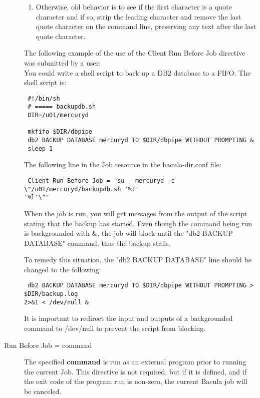 \begin{description}
\begin{enumerate}
\item  Otherwise, old behavior is to see if the first character is
         a quote character and if so, strip the leading character and
         remove the last quote character on the command line, preserving
         any text after the last quote character. 
   
\end{enumerate}

   
The following example of the use of the Client Run Before Job directive was 
submitted by a user:\\
You could write a shell script to back up a DB2 database to a FIFO. The shell
script is:

\footnotesize
\begin{verbatim}
 #!/bin/sh
 # ===== backupdb.sh
 DIR=/u01/mercuryd
 
 mkfifo $DIR/dbpipe
 db2 BACKUP DATABASE mercuryd TO $DIR/dbpipe WITHOUT PROMPTING &
 sleep 1
\end{verbatim}
\normalsize
 
The following line in the Job resource in the bacula-dir.conf file:
\footnotesize
\begin{verbatim}
 Client Run Before Job = "su - mercuryd -c \"/u01/mercuryd/backupdb.sh '%t'
'%l'\""
\end{verbatim}
\normalsize

When the job is run, you will get messages from the output of the script
stating that the backup has started. Even though the command being run is
backgrounded with \&, the job will block until the "db2 BACKUP DATABASE"
command, thus the backup stalls.
 
To remedy this situation, the "db2 BACKUP DATABASE" line should be changed to
the following:
 
\footnotesize
\begin{verbatim} 
 db2 BACKUP DATABASE mercuryd TO $DIR/dbpipe WITHOUT PROMPTING > $DIR/backup.log
2>&1 < /dev/null &
\end{verbatim}
\normalsize

It is important to redirect the input and outputs of a backgrounded command to
/dev/null to prevent the script from blocking.

\item [Run Before Job = \lt{}command\gt{}]
The specified {\bf command} is run as an external program prior to running the
current Job.  This directive is not required, but if it is defined, and if the
exit code of the program run is non-zero, the current Bacula job will be
canceled.


\end{description}

